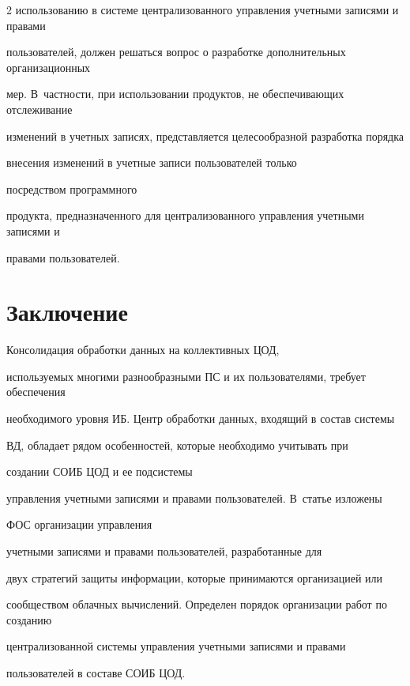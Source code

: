 \begin{multicols}{2}
использованию в сис\-те\-ме централизованного управления учетными записями и правами 


пользователей, должен решаться вопрос о разработке дополнительных организационных 


мер. В~частности, при использовании продуктов, не обеспечивающих отслеживание\linebreak 


изменений в учетных записях, представляется целесообразной разработка порядка 


внесения из\-менений в учетные записи пользователей только\linebreak


посредством программного 


продукта, предназначенного для централизованного управления учетными записями и 


правами пользователей.





\section{Заключение}


       


       Консолидация обработки данных на коллективных ЦОД, 


используемых многими разнообразными ПС и их пользователями, требует обеспечения 


необходимого уровня ИБ. Центр обработки данных, входящий в со\-став сис\-те\-мы 


ВД, обладает рядом особенностей, которые необходимо учитывать при 


создании СОИБ ЦОД и ее под\-сис\-те\-мы 


управления учетными записями и правами пользователей. В~статье изложены


ФОС организации  управ\-ле\-ния\linebreak


 учетными записями и правами пользователей, разработанные для 


двух стратегий защиты информации, которые принимаются организацией или 


сообщест\-вом облачных вычислений. Определен порядок организации работ по созданию 


централизованной сис\-те\-мы управ\-ле\-ния учетными записями и правами 


пользователей в составе СОИБ ЦОД.






\end{multicols}
